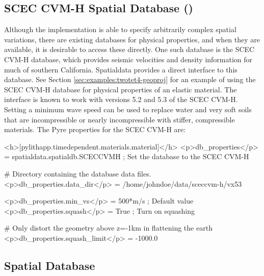 \subsection{SCEC CVM-H Spatial Database ()}
\label{sec:SCEC:CVM-H}

Although the  implementation is able to specify arbitrarily
complex spatial variations, there are existing databases for physical
properties, and when they are available, it is desirable to access
these directly. One such database is the SCEC CVM-H database, which
provides seismic velocities and density information for much of southern
California. Spatialdata provides a direct interface to this database.
See Section \vref{sec:examples:twotet4-geoproj} for an example of
using the SCEC CVM-H database for physical properties of an elastic
material. The interface is known to work with versions 5.2 and 5.3
of the SCEC CVM-H. Setting a minimum wave speed can be used to replace
water and very soft soils that are incompressible or nearly incompressible
with stiffer, compressible materials. The Pyre properties for the
SCEC CVM-H are:
\begin{inventory}
\end{inventory}

\begin{cfg}
<h>[pylithapp.timedependent.materials.material]</h>
<p>db_properties</p> = spatialdata.spatialdb.SCECCVMH ; Set the database to the SCEC CVM-H

# Directory containing the database data files.
<p>db_properties.data_dir</p> = /home/johndoe/data/sceccvm-h/vx53

<p>db_properties.min_vs</p> = 500*m/s ; Default value
<p>db_properties.squash</p> = True ; Turn on squashing

# Only distort the geometry above z=-1km in flattening the earth
<p>db_properties.squash_limit</p> = -1000.0
\end{cfg}

\subsection{ Spatial Database}
\label{sec:composite:database}

